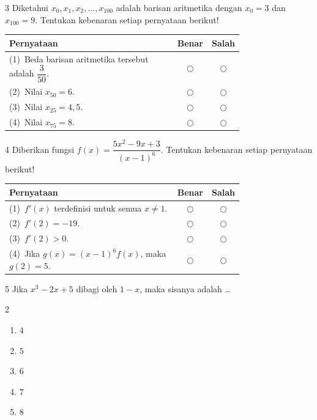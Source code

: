 \documentclass[11pt]{article}
\newenvironment{pilB}{%
  \par\smallskip\begin{multicols}{2}
  \begin{enumerate}[label=(\Alph*),leftmargin=*,itemsep=1pt,topsep=3pt]}%
  {\end{enumerate}\end{multicols}}
\begin{document}
\begin{soal}{3}
Diketahui $x_0,x_1,x_2,\ldots,x_{100}$ adalah barisan aritmetika dengan
$x_0=3$ dan $x_{100}=9$. Tentukan kebenaran setiap pernyataan berikut!

\par\smallskip
{\renewcommand{\arraystretch}{1.4}%
\begin{tabular}{@{}p{0.76\linewidth}cc@{}}
\hline
\textbf{Pernyataan} & \textbf{Benar} & \textbf{Salah}\\
\hline
(1)~Beda barisan aritmetika tersebut adalah $\dfrac{3}{50}$.
  & $\bigcirc$ & $\bigcirc$\\
(2)~Nilai $x_{50} = 6$.
  & $\bigcirc$ & $\bigcirc$\\
(3)~Nilai $x_{25} = 4{,}5$.
  & $\bigcirc$ & $\bigcirc$\\
(4)~Nilai $x_{75} = 8$.
  & $\bigcirc$ & $\bigcirc$\\
\hline
\end{tabular}}
\end{soal}

\begin{soal}{4}
Diberikan fungsi $f(x)=\dfrac{5x^2-9x+3}{(x-1)^6}$.
Tentukan kebenaran setiap pernyataan berikut!

\par\smallskip
{\renewcommand{\arraystretch}{1.4}%
\begin{tabular}{@{}p{0.76\linewidth}cc@{}}
\hline
\textbf{Pernyataan} & \textbf{Benar} & \textbf{Salah}\\
\hline
(1)~$f'(x)$ terdefinisi untuk semua $x\neq1$.
  & $\bigcirc$ & $\bigcirc$\\
(2)~$f'(2) = -19$.
  & $\bigcirc$ & $\bigcirc$\\
(3)~$f'(2) > 0$.
  & $\bigcirc$ & $\bigcirc$\\
(4)~Jika $g(x)=(x-1)^6 f(x)$, maka $g(2)=5$.
  & $\bigcirc$ & $\bigcirc$\\
\hline
\end{tabular}}
\end{soal}

\begin{soal}{5}
Jika $x^3-2x+5$ dibagi oleh $1-x$, maka sisanya adalah \ldots
\begin{pilB}
  \item $4$ \item $5$ \item $6$ \item $7$ \item $8$
\end{pilB}
\end{soal}
\end{document}
